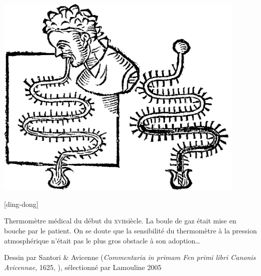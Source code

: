 {\begin{landscape}
\begin{minipage}[b]{0.45\linewidth}
	\label{fig_thermometre_air}
\end{minipage}\hspace{1cm}%
\begin{minipage}[b]{0.45\linewidth}
	\begin{center}
		\includegraphics[width=0.9\textwidth]{images/thermometre_medical_1625.png}
	\end{center}
	\captionsetup{singlelinecheck=off}
   [ding-dong]{Thermomètre médical du début du \textsc{xvii}\ieme siècle. La boule de gaz était mise en bouche par le patient. On se doute que la sensibilité du thermomètre à la pression atmosphérique n’était pas le plus gros obstacle à son adoption…\begin{credits}Dessin par Santori \& Avicenne (\textit{Commentaria in primam Fen primi libri Canonis Avicennae}, 1625, \pd), sélectionné par Lamouline 2005~\cite{lamouline2005}\end{credits}}
	\label{fig_thermometre_medical}
\end{minipage}
\end{landscape}
}%

